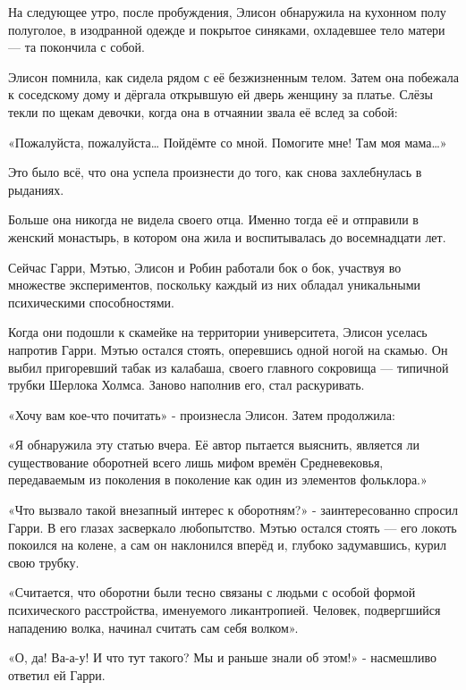 \documentclass[a4paper,12pt]{book}
\begin{document}
\par
На следующее утро, после пробуждения, Элисон обнаружила на кухонном полу полуголое, в изодранной одежде и покрытое синяками, охладевшее тело матери — та покончила с собой.
\par
Элисон помнила, как сидела рядом с её безжизненным телом. Затем она побежала к соседскому дому и дёргала открывшую ей дверь женщину за платье. Слёзы текли по щекам девочки, когда она в отчаянии звала её вслед за собой:
\par
«Пожалуйста, пожалуйста… Пойдёмте со мной. Помогите мне! Там моя мама…»
\par
Это было всё, что она успела произнести до того, как снова захлебнулась в рыданиях.
\par
Больше она никогда не видела своего отца. Именно тогда её и отправили в женский монастырь, в котором она жила и воспитывалась до восемнадцати лет.\\
\par
Сейчас Гарри, Мэтью, Элисон и Робин работали бок о бок, участвуя во множестве экспериментов, поскольку каждый из них обладал уникальными психическими способностями.\\
\par
Когда они подошли к скамейке на территории университета, Элисон уселась напротив Гарри. Мэтью остался стоять, оперевшись одной ногой на скамью. Он выбил пригоревший табак из калабаша, своего главного сокровища — типичной трубки Шерлока Холмса. Заново наполнив его, стал раскуривать.\\
\par
«Хочу вам кое-что почитать» - произнесла Элисон. Затем продолжила:
\par
«Я обнаружила эту статью вчера. Её автор пытается выяснить, является ли существование оборотней всего лишь мифом времён Средневековья, передаваемым из поколения в поколение как один из элементов фольклора.»\\
\par
«Что вызвало такой внезапный интерес к оборотням?» - заинтересованно спросил Гарри. В его глазах засверкало любопытство. Мэтью остался стоять — его локоть покоился на колене, а сам он наклонился вперёд и, глубоко задумавшись, курил свою трубку.
\par
«Считается, что оборотни были тесно связаны с людьми с особой формой психического расстройства, именуемого ликантропией. Человек, подвергшийся нападению волка, начинал считать сам себя волком».
\par
«О, да! Ва-а-у! И что тут такого? Мы и раньше знали об этом!» - насмешливо ответил ей Гарри.
\end{document}
